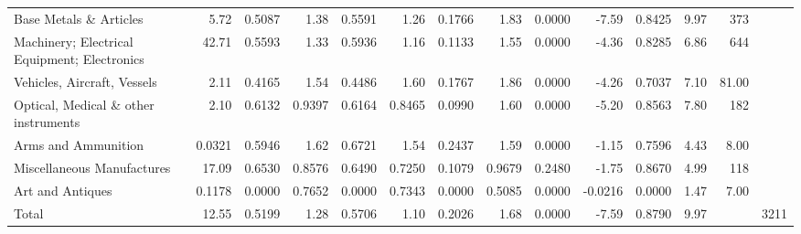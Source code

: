 {\begin{tabular}{lrrrrrrrrrrrrr}
Base Metals \& Articles & 5.72 & 0.5087 & 1.38 & 0.5591 & 1.26 & 0.1766 & 1.83 & 0.0000 & -7.59 & 0.8425 & 9.97 & 373 &  \\
Machinery; Electrical Equipment; Electronics & 42.71 & 0.5593 & 1.33 & 0.5936 & 1.16 & 0.1133 & 1.55 & 0.0000 & -4.36 & 0.8285 & 6.86 & 644 &  \\
Vehicles, Aircraft, Vessels & 2.11 & 0.4165 & 1.54 & 0.4486 & 1.60 & 0.1767 & 1.86 & 0.0000 & -4.26 & 0.7037 & 7.10 & 81.00 &  \\
Optical, Medical \& other instruments & 2.10 & 0.6132 & 0.9397 & 0.6164 & 0.8465 & 0.0990 & 1.60 & 0.0000 & -5.20 & 0.8563 & 7.80 & 182 &  \\
Arms and Ammunition & 0.0321 & 0.5946 & 1.62 & 0.6721 & 1.54 & 0.2437 & 1.59 & 0.0000 & -1.15 & 0.7596 & 4.43 & 8.00 &  \\
Miscellaneous Manufactures & 17.09 & 0.6530 & 0.8576 & 0.6490 & 0.7250 & 0.1079 & 0.9679 & 0.2480 & -1.75 & 0.8670 & 4.99 & 118 &  \\
Art and Antiques & 0.1178 & 0.0000 & 0.7652 & 0.0000 & 0.7343 & 0.0000 & 0.5085 & 0.0000 & -0.0216 & 0.0000 & 1.47 & 7.00 &  \\
Total & 12.55 & 0.5199 & 1.28 & 0.5706 & 1.10 & 0.2026 & 1.68 & 0.0000 & -7.59 & 0.8790 & 9.97 &  & 3211 \\
\bottomrule
\end{tabular}
}
